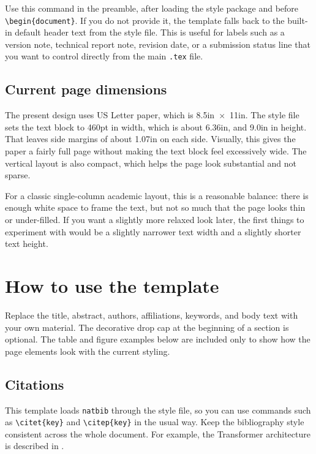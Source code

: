 \documentclass{article} %
\begin{document}
Use this command in the preamble, after loading the style package and before
\verb|\begin{document}|. If you do not provide it, the template falls back to
the built-in default header text from the style file. This is useful for labels
such as a version note, technical report note, revision date, or a submission
status line that you want to control directly from the main \texttt{.tex} file.

\subsection{Current page dimensions}

The present design uses US Letter paper, which is \mbox{8.5in \(\times\) 11in}.
The style file sets the text block to 460pt in width, which is about 6.36in,
and 9.0in in height. That leaves side margins of about 1.07in on each side.
Visually, this gives the paper a fairly full page without making the text block
feel excessively wide. The vertical layout is also compact, which helps the
page look substantial and not sparse.

For a classic single-column academic layout, this is a reasonable balance:
there is enough white space to frame the text, but not so much that the page
looks thin or under-filled. If you want a slightly more relaxed look later, the
first things to experiment with would be a slightly narrower text width and a
slightly shorter text height.

\section{How to use the template}

Replace the title, abstract, authors, affiliations, keywords, and body text
with your own material. The decorative drop cap at the beginning of a section
is optional. The table and figure examples below are included only to show how
the page elements look with the current styling.

\subsection{Citations}

This template loads \texttt{natbib} through the style file, so you can use
commands such as \verb|\citet{key}| and \verb|\citep{key}| in the usual way.
Keep the bibliography style consistent across the whole document. For example,
the Transformer architecture is described in \citep{vaswani2017attention}.
\end{document}
